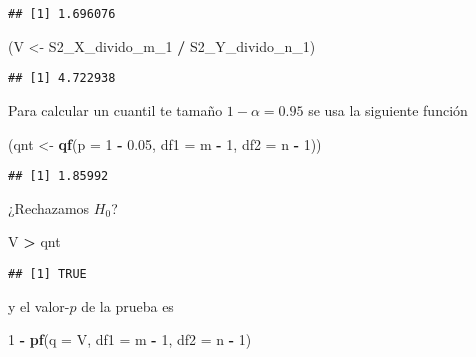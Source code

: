 \documentclass[
  12pt,
]{book}
\newenvironment{Shaded}{\begin{snugshade}}{\end{snugshade}}
\newcommand{\DataTypeTok}[1]{\textcolor[rgb]{0.13,0.29,0.53}{#1}}
\newcommand{\DecValTok}[1]{\textcolor[rgb]{0.00,0.00,0.81}{#1}}
\newcommand{\FloatTok}[1]{\textcolor[rgb]{0.00,0.00,0.81}{#1}}
\newcommand{\KeywordTok}[1]{\textcolor[rgb]{0.13,0.29,0.53}{\textbf{#1}}}
\newcommand{\NormalTok}[1]{#1}
\newcommand{\OperatorTok}[1]{\textcolor[rgb]{0.81,0.36,0.00}{\textbf{#1}}}
\newcommand{\StringTok}[1]{\textcolor[rgb]{0.31,0.60,0.02}{#1}}
\begin{document}
\begin{verbatim}
## [1] 1.696076
\end{verbatim}

\begin{Shaded}
\begin{Highlighting}[]
\NormalTok{(V \textless{}{-}}\StringTok{ }\NormalTok{S2\_X\_divido\_m\_}\DecValTok{1} \OperatorTok{/}\StringTok{ }\NormalTok{S2\_Y\_divido\_n\_}\DecValTok{1}\NormalTok{)}
\end{Highlighting}
\end{Shaded}

\begin{verbatim}
## [1] 4.722938
\end{verbatim}

Para calcular un cuantil te tamaño \(1-\alpha = 0.95\) se usa la siguiente función

\begin{Shaded}
\begin{Highlighting}[]
\NormalTok{(qnt \textless{}{-}}\StringTok{ }\KeywordTok{qf}\NormalTok{(}\DataTypeTok{p =} \DecValTok{1} \OperatorTok{{-}}\StringTok{ }\FloatTok{0.05}\NormalTok{, }\DataTypeTok{df1 =}\NormalTok{ m }\OperatorTok{{-}}\StringTok{ }\DecValTok{1}\NormalTok{, }\DataTypeTok{df2 =}\NormalTok{ n }\OperatorTok{{-}}\StringTok{ }\DecValTok{1}\NormalTok{))}
\end{Highlighting}
\end{Shaded}

\begin{verbatim}
## [1] 1.85992
\end{verbatim}

¿Rechazamos \(H_0\)?

\begin{Shaded}
\begin{Highlighting}[]
\NormalTok{V }\OperatorTok{\textgreater{}}\StringTok{ }\NormalTok{qnt}
\end{Highlighting}
\end{Shaded}

\begin{verbatim}
## [1] TRUE
\end{verbatim}

y el valor-\(p\) de la prueba es

\begin{Shaded}
\begin{Highlighting}[]
\DecValTok{1} \OperatorTok{{-}}\StringTok{ }\KeywordTok{pf}\NormalTok{(}\DataTypeTok{q =}\NormalTok{ V, }\DataTypeTok{df1 =}\NormalTok{ m }\OperatorTok{{-}}\StringTok{ }\DecValTok{1}\NormalTok{, }\DataTypeTok{df2 =}\NormalTok{ n }\OperatorTok{{-}}\StringTok{ }\DecValTok{1}\NormalTok{)}
\end{Highlighting}
\end{Shaded}
\end{document}
